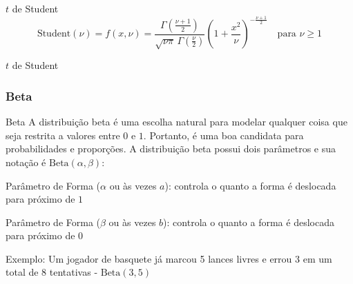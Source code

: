 \begin{frame}{$t$ de Student}
    $$\text{Student}(\nu) = f(x, \nu) = \frac{\Gamma \left(\frac{\nu+1}{2} \right)} {\sqrt{\nu\pi}\,\Gamma \left(\frac{\nu}{2} \right)} \left(1+\frac{x^2}{\nu} \right)^{-\frac{\nu+1}{2}} \quad \text{para $\nu \geq 1$}$$
\end{frame}

\begin{frame}{$t$ de Student}
    \centering
\end{frame}

\subsubsection{Beta}
\begin{frame}{Beta}
    A distribuição beta é uma escolha natural para modelar qualquer coisa
    que seja restrita a valores entre $0$ e $1$. Portanto, é uma boa candidata
    para probabilidades e proporções.
    \vfill
    A distribuição beta possui dois parâmetros e sua notação é $\text{Beta} (\alpha, \beta)$:
    \begin{vfilleditems}
        \item Parâmetro de Forma ($\alpha$ ou às vezes $a$): controla o quanto a forma é deslocada para próximo de $1$
        \item Parâmetro de Forma ($\beta$ ou às vezes $b$): controla o quanto a forma é deslocada para próximo de $0$
    \end{vfilleditems}
    \vfill
    Exemplo: Um jogador de basquete já marcou 5 lances livres e errou 3 em um
    total de 8 tentativas - $\text{Beta}(3, 5)$
\end{frame}

